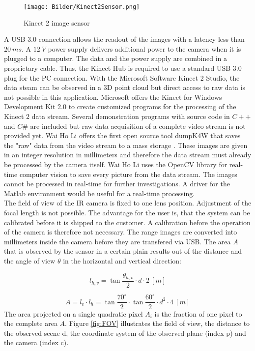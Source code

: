 \begin{figure}[!h]
	\centering
	\texttt{[image: Bilder/Kinect2Sensor.png]}
	\caption{Kinect 2 image sensor \cite{payne20147}}
	\label{fig:Kinect2_ImageSensor}
\end{figure} 


A USB 3.0 connection allows the readout of the images with a latency less than $20~ms$. A $12~V$ power supply delivers additional power to the camera when it is plugged to a computer. The data and the power supply are combined in a proprietary cable. Thus, the Kinect Hub is required to use a standard USB 3.0 plug for the PC connection. With the Microsoft Software Kinect 2 Studio, the data steam can be observed in a 3D point cloud but direct access to raw data is not possible in this application. Microsoft offers the Kinect for Windows Development Kit 2.0 to create customized programs for the processing of the Kinect 2 data stream. Several demonstration programs with source code in $C++$ and $C\#$ are included but raw data acquisition of a complete video stream is not provided yet. Wai Ho Li offers the first open source tool dumpK4W that saves the "raw" data from the video stream to a mass storage \cite{dumpk4W}. These images are given in an integer resolution in millimeters and therefore the data stream must already be processed by the camera itself. Wai Ho Li uses the OpenCV library for real-time computer vision to save every picture from the data stream. The images cannot be processed in real-time for further investigations. A driver for the Matlab environment would be useful for a real-time processing.\\

The field of view of the IR camera is fixed to one lens position. Adjustment of the focal length is not possible. The advantage for the user is, that the system can be calibrated before it is shipped to the customer. A calibration before the operation of the camera is therefore not necessary. The range images are converted into millimeters inside the camera before they are transfered via USB. The area $A$ that is observed by the sensor in a certain plain results out of the distance and the angle of view $\theta$ in the horizontal and vertical direction: 

\begin{equation}\label{eq:lfov}
l_{h,v} = \tan{\frac{\theta_{h,v}}{2}}\cdot d \cdot 2~[m]
\end{equation}

\begin{equation}\label{eq:area}
A = l_v\cdot l_h = \tan{\frac{70^\circ}{2}}\cdot \tan{\frac{60^\circ}{2}} \cdot d^2 \cdot 4~[m]
\end{equation}
\medskip
The area projected on a single quadratic pixel $A_i$ is the fraction of one pixel to the complete area $A$. Figure \ref{fig:FOV} illustrates the field of view, the distance to the observed scene d, the coordinate system of the observed plane (index p) and the camera (index c).

